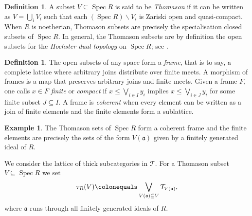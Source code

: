 \documentclass{amsart}[a4]
\theoremstyle{definition}
\newtheorem{definition}[theorem]{Definition}
\newtheorem{example}[theorem]{Example}
\theoremstyle{remark}
\numberwithin{equation}{section}
\newcommand{\Spec}{\operatorname{Spec}}
\newcommand{\cat}{\mathcal}
\newcommand{\fa}{\mathfrak{a}}
\begin{document}
\begin{definition}
  A subset $V\subseteq\Spec R$ is said to be \emph{Thomason} if it can
  be written as $V=\bigcup_i V_i$ such that each
  $(\Spec R)\smallsetminus V_i$ is Zariski open and quasi-compact. When $R$
  is noetherian, Thomason subsets are precisely the specialisation
  closed subsets of $\Spec R$.  In general, the Thomason subsets are
  by definition the open subsets for the \emph{Hochster dual topology}
  on $\Spec R$; see \cite{Hochster:1969a}.
\end{definition}

\begin{definition}
  The open subsets of any space form a \emph{frame}, that is to say, a
complete lattice where arbitrary joins distribute over finite meets.
A morphism of frames is a map that preserves arbitrary joins and
finite meets.  Given a frame $F$, one calls $x\in F$ \emph{finite} or
\emph{compact} if $x\le\bigvee_{i\in I}y_i$ implies
$x\le\bigvee_{i\in J}y_i$ for some finite subset $J\subseteq I$. A
frame is \emph{coherent} when every element can be written as a join
of finite elements and the finite elements form a sublattice.
\end{definition}

\begin{example}
  The Thomason sets of $\Spec R$ form a coherent frame and the finite
  elements are precisely the sets of the form $V(\fa)$ given by a
  finitely generated ideal of $R$.
\end{example}

We consider the lattice of thick subcategories in
$\cat T$.  For a Thomason subset $V\subseteq \Spec R$ we set
  \[
  \tau_R(V)\colonequals \bigvee_{V(\fa)\subseteq V} \cat T_{V(\fa)},
\]
where $\fa$ runs through all finitely generated ideals of $R$.
\end{document}
